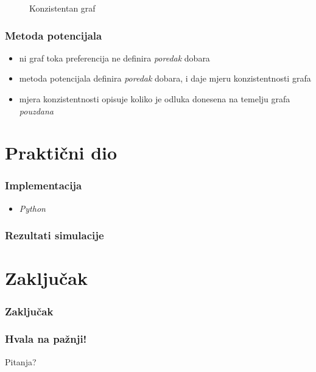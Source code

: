 \documentclass[11pt, notheorems]{beamer}
\begin{document}
\begin{frame}
{\begin{figure}
\begin{minipage}{0.45\linewidth}
          \caption{Konzistentan graf}
        \end{minipage}
      \end{figure}}
  \end{frame}

  \begin{frame}
    \frametitle{Metoda potencijala}
    \begin{itemize}
      \item ni \alert{graf toka preferencija} ne definira \emph{poredak} dobara
      \item \alert{metoda potencijala} definira \emph{poredak} dobara, i daje \alert{mjeru konzistentnosti} grafa
      \item \alert{mjera konzistentnosti} opisuje koliko je odluka donesena na temelju grafa \emph{pouzdana}
    \end{itemize}
  \end{frame}

  \section{Praktični dio}
  \begin{frame}
    \frametitle{Implementacija}
    \begin{itemize}
      \item \alert{\textit{Python}}
    \end{itemize}
  \end{frame}

  \begin{frame}
    \frametitle{Rezultati simulacije}
  \end{frame}

  \section{Zaključak}
  \begin{frame}
    \frametitle{Zaključak}
  \end{frame}

  \begin{frame}
    \frametitle{Hvala na pažnji!}
    \centering \Huge Pitanja?
\end{frame}
  
\end{document}
